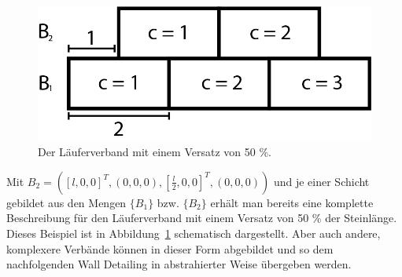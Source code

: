 \begin{figure}[hb!]
    \centering
    \includegraphics[width=0.7\columnwidth]{fig/concept_Mauerwerksverband.png}
    \caption{Der Läuferverband mit einem Versatz von 50 \%.}\label{fig:concept:concept_Mauerwerksverband}
\end{figure}

Mit \(B_2 = ({[l, 0, 0]}^T, (0, 0, 0), {[\frac{l}{2}, 0, 0]}^T, (0, 0, 0))\) und je einer Schicht gebildet aus den Mengen \(\{B_1\}\) bzw. \(\{B_2\}\) erhält man bereits eine komplette Beschreibung für den Läuferverband mit einem Versatz von 50 \% der Steinlänge.
Dieses Beispiel ist in Abbildung~\ref{fig:concept:concept_Mauerwerksverband} schematisch dargestellt.
Aber auch andere, komplexere Verbände können in dieser Form abgebildet und so dem nachfolgenden Wall Detailing in abstrahierter Weise übergeben werden.

